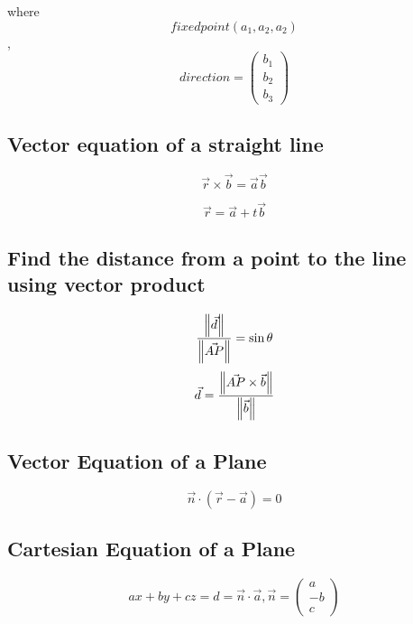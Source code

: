 \documentclass[a4paper,9pt]{scrartcl}
\begin{document}
    where \begin{displaymath}
              fixed point (a_1, a_2, a_2)
    \end{displaymath},
    \begin{displaymath}
        direction = \begin{pmatrix}
                        b_1 \\ b_2 \\ b_3
        \end{pmatrix}
    \end{displaymath}

    \subsection{Vector equation of a straight line}
    \begin{displaymath}
        \vec{r}\times\vec{b} = \vec{a}\vec{b}
    \end{displaymath}

    \begin{displaymath}
        \vec{r} = \vec{a} + t\vec{b}
    \end{displaymath}

    \subsection{Find the distance from a point to the line using vector product}
    \begin{displaymath}
        \frac{\left\| \vec{d} \right\|}{\left\| \vec{AP} \right\|} = \sin\theta
    \end{displaymath}
    \begin{displaymath}
        \vec{d} = \frac{\left\| \vec{AP}\times\vec{b} \right\|}{\left\| \vec{b} \right\|}
    \end{displaymath}

    \subsection{Vector Equation of a Plane}
    \begin{displaymath}
        \vec{n}\cdot\left( \vec{r} - \vec{a} \right) = 0
    \end{displaymath}

    \subsection{Cartesian Equation of a Plane}
    \begin{displaymath}
        ax + by + cz = d = \vec{n}\cdot\vec{a}, \vec{n}=\begin{pmatrix}
                                                            a \\
                                                            - b \\
                                                            c
        \end{pmatrix}
    \end{displaymath}
\end{document}
